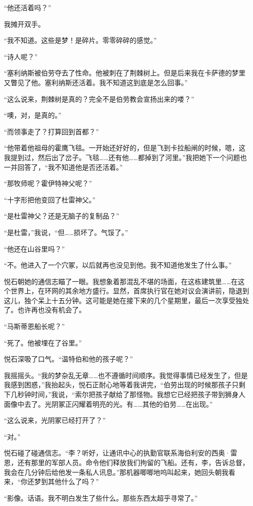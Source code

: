 \documentclass[AutoFakeBold=true]{book}
\begin{document}
``他还活着吗？''

我摊开双手。

``我不知道。这些是梦！是碎片。零零碎碎的感觉。''

``诗人呢？''

``塞利纳斯被伯劳夺去了性命。他被刺在了荆棘树上。但是后来我在卡萨德的梦里又瞥见了他。塞利纳斯还活着。我不知道这到底是怎么回事。''

``这么说来，荆棘树是真的？完全不是伯劳教会宣扬出来的喽？''

``噢，对，是真的。''

``而领事走了？打算回到首都？''

``他带着他祖母的霍鹰飞毯。一开始还好好的，但是飞到卡拉船闸的时候，嗯，这我提到过，然后出了岔子。飞毯……还有他……都掉到了河里。''我把她下一个问题也一并回答了，``我不知道他是否还活着。''

``那牧师呢？霍伊特神父呢？''

``十字形把他变回了杜雷神父。''

``是杜雷神父？还是无脑子的复制品？''

``是杜雷，''我说，``但……损坏了。气馁了。''

``他还在山谷里吗？''

``不。他进入了一个穴冢，以后就再也没见到他。我不知道他发生了什么事。''

悦石朝她的通信志瞄了一眼。我想象着那混乱不堪的场面，在这栋建筑里……在这个世界上，在环网的其余地方盛行。显然，首席执行官在她对议会演讲前，隐退到这儿，独个呆上十五分钟。这可能是她在接下来的几个星期里，最后一次享受独处了。也许再也没有机会了。

``马斯蒂恩船长呢？''

``死了。他被埋在了谷里。''

悦石深吸了口气。``温特伯和他的孩子呢？''

我摇摇头。``我的梦杂乱无章……也不遵循时间顺序。我觉得事情已经发生了，但是我感到困惑，''我抬起头，悦石正耐心地等着我讲完，``伯劳出现的时候那孩子只剩下几秒钟时间，''我说，``索尔把孩子献给了那怪物。我想它已经把孩子带到狮身人面像中去了。光阴冢正闪耀着明亮的光。有……其他的伯劳……在出现。''

``这么说来，光阴冢已经打开了？''

``对。''

悦石碰了碰通信志。``李？听好，让通讯中心的执勤官联系海伯利安的西奥·雷恩，还有那里的军部人员。命令他们释放我们拘留的飞船。还有，李，告诉总督，我会在几分钟后给他发一条私人讯息。''那机器唧唧地呜叫起来，她回头朝我看来，``你还梦到其他什么了吗？''

``影像。话语。我不明白发生了些什么。那些东西太超乎寻常了。''
\end{document}
